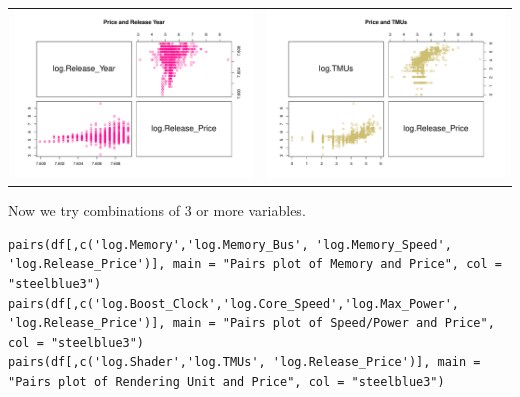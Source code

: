 \documentclass[a4paper]{article}
\begin{document}
\begin{center}
\begin{adjustbox}{width=\textwidth}
\begin{tabular}{cc}
        \includegraphics[keepaspectratio, width=1\textwidth, height=1\textheight]{Visualization/Pairs/price_releaseyear.pdf}
        &\includegraphics[keepaspectratio, width=1\textwidth, height=1\textheight]{Visualization/Pairs/price_TMUs.pdf}
    \end{tabular}
\end{adjustbox}
\end{center}
Now we try combinations of 3 or more variables.
\begin{mdframed}[leftline=false,rightline=false,backgroundcolor=lightblue!10,nobreak=false]
    \begin{verbatim}
pairs(df[,c('log.Memory','log.Memory_Bus', 'log.Memory_Speed', 'log.Release_Price')], main = "Pairs plot of Memory and Price", col = "steelblue3")
pairs(df[,c('log.Boost_Clock','log.Core_Speed','log.Max_Power', 'log.Release_Price')], main = "Pairs plot of Speed/Power and Price", col = "steelblue3")
pairs(df[,c('log.Shader','log.TMUs', 'log.Release_Price')], main = "Pairs plot of Rendering Unit and Price", col = "steelblue3")
    \end{verbatim}
\end{mdframed}
\end{document}
